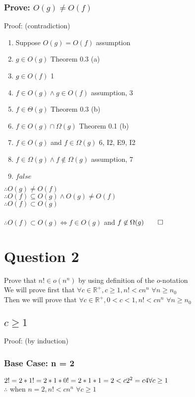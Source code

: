 \documentclass{article}
\begin{document}
      \subsubsection{Prove: $O(g) \neq O(f)$}
        Proof: (contradiction)
        \begin{enumerate}
          \item Suppose $O(g) = O(f)$ \hfill assumption
          \item $g \in O(g)$ \hfill Theorem 0.3 (a)
          \item $g \in O(f)$ \hfill 1
          \item $f \in O(g) \land g \in O(f)$ \hfill assumption, 3
          \item $f \in \Theta(g)$ \hfill Theorem 0.3 (b)
          \item $f \in O(g) \cap \Omega(g)$ \hfill Theorem 0.1 (b)
          \item $f \in O(g)$ and $f \in \Omega(g)$ \hfill 6, I2, E9, I2
          \item $f \in \Omega(g) \land f \not\in \Omega(g)$ \hfill assumption, 7
          \item $false$
        \end{enumerate}
        $\therefore O(g) \neq O(f)$ \\
        $\therefore O(f) \subseteq O(g) \land O(g) \neq O(f)$ \\
        $\therefore O(f) \subset O(g)$ \\ 
        \\
        $\therefore O(f) \subset O(g) \Leftrightarrow f \in O(g)$ and $f \not\in \Omega(g) \hfill \qed$
	\section{Question 2}
    Prove that $n! \in o(n^{n})$ by using definition of the $o$-notation \\
    We will prove first that $\forall c \in \mathbb{R}^{+}, c \geq 1, n$!$ < cn^{n}$  $\forall n \geq n_{0}$ \\
    Then we will prove that $\forall c \in \mathbb{R}^{+}, 0 < c < 1, n! < cn^{n}$  $\forall n \geq n_{0}$ \\
    \subsection{$c \geq 1$}
      Proof: (by induction) \\
      \subsubsection{Base Case: n = 2}
        $2! = 2 * 1! = 2 * 1 * 0! = 2 * 1 * 1 = 2 < c2^{2} = c4 \hfill \forall c \geq 1$ \\
        $\therefore$ when $n = 2, n! < cn^{n}$  $\forall c \geq 1$
\end{document}

